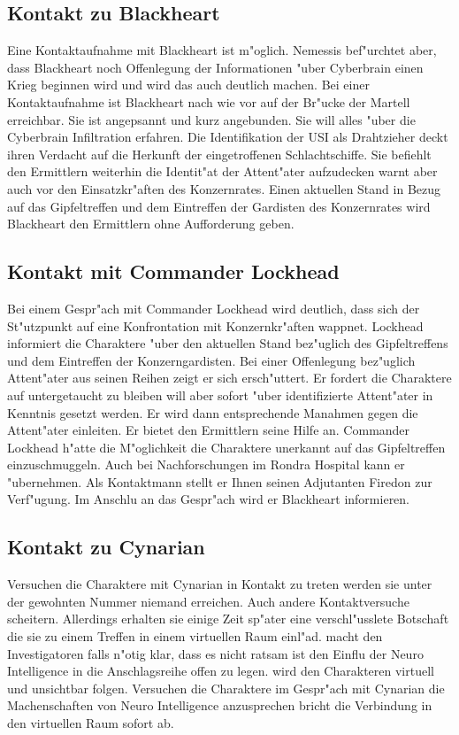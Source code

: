 \subsection{Kontakt zu Blackheart} 
Eine Kontaktaufnahme mit Blackheart ist m"oglich. Nemessis bef"urchtet aber, dass Blackheart noch Offenlegung der Informationen "uber Cyberbrain einen Krieg beginnen wird und wird das auch deutlich machen. Bei einer Kontaktaufnahme ist Blackheart nach wie vor auf der Br"ucke der Martell erreichbar. Sie ist angepsannt und kurz angebunden. Sie will alles "uber die Cyberbrain Infiltration erfahren. Die Identifikation der USI als Drahtzieher deckt ihren Verdacht auf die Herkunft der eingetroffenen Schlachtschiffe. Sie befiehlt den Ermittlern weiterhin die Identit"at der Attent"ater aufzudecken warnt aber auch vor den Einsatzkr"aften des Konzernrates. Einen aktuellen Stand in Bezug auf das Gipfeltreffen und dem Eintreffen der Gardisten des Konzernrates wird Blackheart den Ermittlern ohne Aufforderung geben.

\subsection{Kontakt mit Commander Lockhead} 
Bei einem Gespr"ach mit Commander Lockhead wird deutlich, dass sich der St"utzpunkt auf eine Konfrontation mit Konzernkr"aften wappnet. Lockhead informiert die Charaktere "uber den aktuellen Stand bez"uglich des Gipfeltreffens und dem Eintreffen der Konzerngardisten. Bei einer Offenlegung bez"uglich Attent"ater aus seinen Reihen zeigt er sich ersch"uttert. Er fordert die Charaktere auf untergetaucht zu bleiben will aber sofort "uber identifizierte Attent"ater in Kenntnis gesetzt werden. Er wird dann entsprechende Ma\3nahmen gegen die Attent"ater einleiten. Er bietet den Ermittlern seine Hilfe an. Commander Lockhead h"atte die M"oglichkeit die Charaktere unerkannt auf das Gipfeltreffen einzuschmuggeln. Auch bei Nachforschungen im Rondra Hospital kann er "ubernehmen. Als Kontaktmann stellt er Ihnen seinen Adjutanten Firedon zur Verf"ugung. Im Anschlu\3 an das Gespr"ach wird er Blackheart informieren.

\subsection{Kontakt zu Cynarian} 
Versuchen die Charaktere mit Cynarian in Kontakt zu treten werden sie unter der gewohnten Nummer niemand erreichen. Auch andere Kontaktversuche scheitern. Allerdings erhalten sie einige Zeit sp"ater eine verschl"usslete Botschaft die sie zu einem Treffen in einem virtuellen Raum einl"ad. \xl{} macht den Investigatoren falls n"otig klar, dass es nicht ratsam ist den Einflu\3 der Neuro Intelligence in die Anschlagsreihe offen zu legen. \xl{} wird den Charakteren virtuell und unsichtbar folgen. Versuchen die Charaktere im Gespr"ach mit Cynarian die Machenschaften von Neuro Intelligence anzusprechen bricht die Verbindung in den virtuellen Raum sofort ab. 

